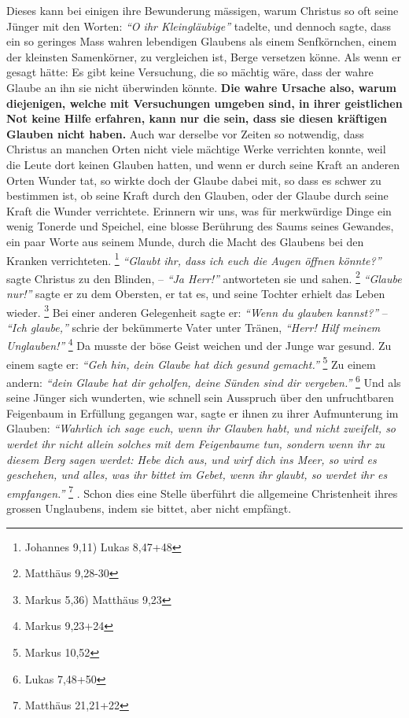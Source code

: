 Dieses kann bei einigen ihre Bewunderung mässigen, warum Christus so oft seine
Jünger mit den Worten:
\textit{"`O ihr Kleingläubige"'} tadelte, und dennoch sagte,
dass ein so geringes Mass wahren lebendigen Glaubens als einem Senfkörnchen,
einem der kleinsten Samenkörner, zu vergleichen ist, Berge versetzen könne. Als
wenn er gesagt hätte: Es gibt keine Versuchung, die so mächtig wäre, dass der
wahre Glaube an ihn sie nicht überwinden könnte. \textbf{Die wahre Ursache also,
warum
diejenigen, welche mit Versuchungen umgeben sind, in ihrer geistlichen Not
keine Hilfe erfahren, kann nur die sein, dass sie diesen kräftigen Glauben nicht
haben.} Auch war derselbe vor Zeiten so notwendig,
dass Christus an manchen
Orten nicht viele mächtige Werke verrichten konnte, weil die Leute dort
keinen Glauben hatten, und wenn er durch seine Kraft an anderen Orten Wunder
tat, so wirkte doch der Glaube dabei mit, so dass es schwer zu bestimmen ist,
ob seine Kraft durch den Glauben, oder der Glaube durch seine Kraft die Wunder
verrichtete. Erinnern wir uns, was für merkwürdige Dinge ein wenig Tonerde und
Speichel, eine blosse Berührung des Saums seines Gewandes, ein paar Worte aus
seinem Munde, durch die Macht des Glaubens bei den Kranken
verrichteten.
\footnote{Johannes 9,11) Lukas 8,47+48}
\textit{"`Glaubt ihr, dass ich euch die
Augen öffnen könnte?"'} sagte Christus zu den Blinden, -- \textit{"`Ja Herr!"'}
antworteten
sie und sahen.
\footnote{Matthäus 9,28-30}
\textit{"`Glaube nur!"'} sagte er zu dem
Obersten, er tat es, und seine Tochter erhielt das Leben wieder.
\footnote{Markus 5,36) Matthäus 9,23}
Bei einer anderen Gelegenheit sagte er:
\textit{"`Wenn du glauben kannst?"'} --
\textit{"`Ich glaube,"'} schrie der bekümmerte Vater unter Tränen,
\textit{"`Herr! Hilf meinem Unglauben!"'}
\footnote{Markus 9,23+24}
Da musste der böse Geist weichen und der
Junge war gesund. Zu einem sagte er:
\textit{"`Geh hin, dein Glaube hat dich gesund gemacht."'}
\footnote{Markus 10,52}
Zu einem andern: \textit{"`dein Glaube hat dir
geholfen, deine Sünden sind dir vergeben."'}
\footnote{Lukas  7,48+50}
Und als seine
Jünger sich wunderten, wie schnell sein Ausspruch über den unfruchtbaren
Feigenbaum in Erfüllung gegangen war, sagte er ihnen zu ihrer Aufmunterung im
Glauben:
\textit{"`Wahrlich ich sage euch, wenn ihr Glauben habt, und nicht zweifelt,
so werdet ihr nicht allein solches mit dem Feigenbaume tun, sondern wenn ihr zu
diesem Berg sagen werdet: Hebe dich aus, und wirf dich ins Meer, so wird es
geschehen, und alles, was ihr bittet im Gebet, wenn ihr glaubt, so werdet ihr
es empfangen."'}
\footnote{Matthäus 21,21+22}
. Schon dies eine Stelle überführt die
allgemeine Christenheit ihres grossen
Unglaubens, indem sie bittet, aber nicht
empfängt.

